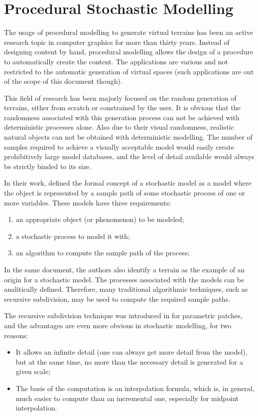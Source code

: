 \documentclass{acmtog}
\begin{document}
\section{Procedural Stochastic Modelling}
The usage of procedural modelling to generate virtual terrains has been an active research topic in computer graphics for more than thirty years. Instead of designing content by hand, procedural modelling allows the design of a procedure to automatically create the content. The applications are various and not restricted to the automatic generation of virtual spaces (such applications are out of the scope of this document though).

This field of research has been majorly focused on the random generation of terrains, either from scratch or constrained by the user. It is obvious that the randomness associated with this generation process can not be achieved with deterministic processes alone. Also due to their visual randomness, realistic natural objects can not be obtained with deterministic modelling. The number of samples required to achieve a visually acceptable model would easily create prohibitively large model databases, and the level of detail available would always be strictly binded to its size.

In their work, \cite{Fournier82} defined the formal concept of a stochastic model as a model where the object is represented by a sample path of some stochastic process of one or more variables. These models have three requirements:
\begin{enumerate}
\item{an appropriate object (or phenomenon) to be modeled;}
\item{a stochastic process to model it with;}
\item{an algorithm to compute the sample path of the process;}
\end{enumerate}
In the same document, the authors also identify a terrain as the example of an origin for a stochastic model. The processes associated with the models can be analitically defined. Therefore, many traditional algorithmic techniques, such as recursive subdivision, may be used to compute the required sample paths.

The recursive subdivision technique was introduced in \cite{Catmull78} for parametric patches, and the advantages are even more obvious in stochastic modelling, for two reasons:
\begin{itemize}
\item{It allows an infinite detail (one can always get more detail from the model), but at the same time, no more than the necessary detail is generated for a given scale;}
\item{The basis of the computation is an interpolation formula, which is, in general, much easier to compute than an incremental one, especially for midpoint interpolation.}
\end{itemize}
\end{document}
